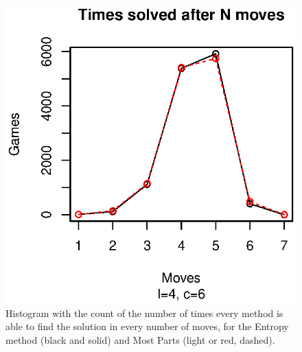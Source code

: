 \documentclass[preprint,12pt]{elsarticle}
\begin{document}
\begin{figure}[!htb]
\centering
\includegraphics{histo-me.eps}
\caption{Histogram with the count of the number of times every method
  is able to find the solution in every number of moves, for the
  Entropy method (black and solid) and Most Parts (light or red, dashed). \label{fig:histo:me}}
\end{figure} 
%
\end{document}
